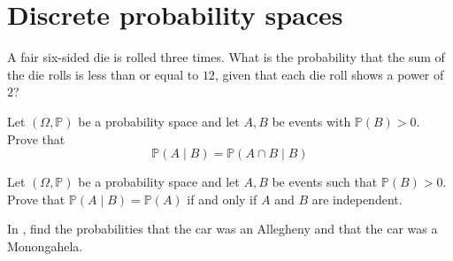 \section{Discrete probability spaces}


\begin{exercise}
A fair six-sided die is rolled three times. What is the probability that the sum of the die rolls is less than or equal to $12$, given that each die roll shows a power of $2$?
\end{exercise}

\begin{exercise}
\label{exConditionalProbabilityOfIntersection}
Let $(\Omega,\mathbb{P})$ be a probability space and let $A,B$ be events with $\mathbb{P}(B)>0$. Prove that
\[ \mathbb{P}(A \mid B) = \mathbb{P}(A \cap B \mid B) \]
\end{exercise}

\begin{exercise}
Let $(\Omega,\mathbb{P})$ be a probability space and let $A,B$ be events such that $\mathbb{P}(B)>0$. Prove that $\mathbb{P}(A \mid B) = \mathbb{P}(A)$ if and only if $A$ and $B$ are independent.
\end{exercise}


\begin{exercise}
In , find the probabilities that the car was an Allegheny and that the car was a Monongahela.
\end{exercise}